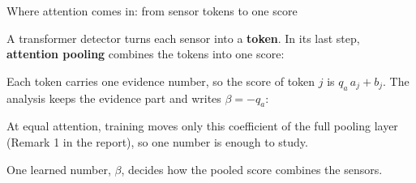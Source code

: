 \documentclass[aspectratio=169,9pt]{beamer}
\newcommand{\slidenotation}{}
\newcommand{\notation}[1]{\gdef\slidenotation{#1}}
\gdef\slidenotation{}%
\newcommand{\takeaway}[1]{\par{\color{Blue}\fontsize{9.5}{11.6}\selectfont #1\par}}
\newcommand{\body}{\fontsize{8.8}{10.8}\selectfont}
\newcommand{\bx}[1]{\fcolorbox{Navy}{white}{\(\displaystyle #1\)}}
\newcommand{\lead}[1]{{\fontsize{9.2}{11.2}\selectfont #1\par}}
\begin{document}
\begin{frame}[t]{Where attention comes in: from sensor tokens to one score}
  \notation{token: the representation of one sensor \(\cdot\) query, key: learned vectors that score each token \(\cdot\) \(\pi_j\): attention weight of sensor \(j\) \(\cdot\) \(u,c\): weight and bias of the output head}
  \lead{A transformer detector turns each sensor into a \textbf{token}. In its last step, \textbf{attention pooling} combines the tokens into one score:}
  \vspace{2mm}
  \begin{center}
  \end{center}
  \vspace{2mm}
  \lead{Each token carries one evidence number, so the score of token \(j\) is \(q_a\,a_j+b_j\). The analysis keeps the evidence part and writes \(\beta=-q_a\):\qquad \bx{\text{score of token } j=-\beta\,a_j}}
  \vspace{1.5mm}
  {\body At equal attention, training moves only this coefficient of the full pooling layer (Remark 1 in the report), so one number is enough to study.\par}
  \takeaway{One learned number, \(\beta\), decides how the pooled score combines the sensors.}

\end{frame}
\end{document}
